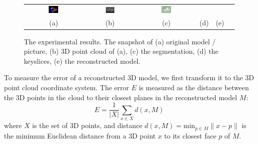 \documentclass[10pt,twocolumn,letterpaper]{article}
\begin{document}
\begin{figure}[htbp]
\begin{center}
\begin{tabular}{cccccc}
\includegraphics[width=0.18\textwidth]{opernhaus_3.png} &
\includegraphics[width=0.18\textwidth]{opernhaus_4.png} &
\includegraphics[width=0.18\textwidth]{opernhaus_6.png} \\
(a) & (b) & (c) & (d) & (e)
\end{tabular}
\end{center}
\caption{The experimental results. The snapshot of 
(a) original model / picture, 
(b) 3D point cloud of (a),
(c) the segmentation,
(d) the keyslices,
(e) the reconstructed model.
}
\label{fig:results}
\end{figure}

%
To measure the error of a reconstructed 3D model, we first transform it
to the 3D point cloud coordinate system.
The error $E$ is measured as the distance between the 3D points in the cloud
to their closest planes in the reconstructed model $M$:
\begin{equation}
E = \frac{1}{|X|}\sum_{x\in{X}}{d(x, M)}
\label{eq:em}
\end{equation}
where $X$ is the set of 3D points, and distance
$d(x, M) = \text{min}_{p \in M}\lVert x - p \lVert$ is the minimum
Euclidean distance from a 3D point $x$ to its closest face $p$ of $M$.
\end{document}
